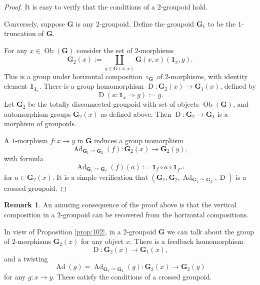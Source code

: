 \documentclass[a4paper,10pt]{amsart}
\theoremstyle{definition}
\newtheorem{rem}[equation]{Remark}
\numberwithin{equation}{section}
\newcommand{\opn}{\operatorname}
\newcommand{\bsym}[1]{\boldsymbol{#1}}
\newcommand{\twoto}{\Rightarrow}
\begin{document}
\begin{proof}
It is easy to verify that the conditions of a $2$-groupoid hold. 

Conversely, suppose $\bsym{G}$ is any $2$-groupoid. Define the groupoid
$\bsym{G}_1$ to be the $1$-truncation of $\bsym{G}$. 

For any $x \in \opn{Ob}(\bsym{G})$ consider the set of $2$-morphisms
\begin{equation} \label{eqn:105}
\bsym{G}_2(x) := \coprod_{g \in \bsym{G}(x, x)} 
\bsym{G}(x, x)(\bsym{1}_x, g) .
\end{equation}
This is a group under horizontal composition $\circ_{\bsym{G}}$
of $2$-morphisms, with identity element 
$\bsym{1}_{\bsym{1}_x}$. There is a group homomorphism 
$\opn{D} : \bsym{G}_2(x) \to \bsym{G}_1(x)$, defined by 
\begin{equation} \label{eqn:104}
\opn{D}(a : \bsym{1}_x \twoto g) := g  .
\end{equation}
Let $\bsym{G}_2$ be the totally disconnected groupoid with set of objects 
$\opn{Ob}(\bsym{G})$, and automorphism groups $\bsym{G}_2(x)$ as defined above.
Then $\opn{D} : \bsym{G}_2 \to \bsym{G}_1$
is a morphism of groupoids.

A $1$-morphism $f : x \to y$ in $\bsym{G}$ induces a group isomorphism 
\[ \opn{Ad}_{\bsym{G}_1 \curvearrowright \bsym{G}_{2}}(f) : 
\bsym{G}_2(x) \to \bsym{G}_2(y) , \]
with formula
\begin{equation} \label{eqn:106}
\opn{Ad}_{\bsym{G}_1 \curvearrowright \bsym{G}_{2}}(f)(a) := 
\bsym{1}_f \circ a \circ \bsym{1}_{f^{-1}} 
\end{equation}
for $a \in \bsym{G}_2(x)$.
It is a simple verification that
$(\bsym{G}_1, \bsym{G}_{2}, 
\opn{Ad}_{\bsym{G}_1 \curvearrowright \bsym{G}_{2}}, \opn{D})$
is a crossed groupoid.
\end{proof}

\begin{rem}
An amusing consequence of the proof above is that the vertical
composition in a $2$-groupoid can be recovered from the horizontal
compositions.
\end{rem}

In view of Proposition \ref{prop:102}, in a $2$-groupoid $\bsym{G}$ 
we can talk about the group of $2$-morphisms 
$\bsym{G}_2(x)$ for any object $x$. There is a feedback homomorphism 
\[ \opn{D} :  \bsym{G}_2(x) \to \bsym{G}_1(x) , \]
and a twisting 
\[ \opn{Ad}(g) =  
\opn{Ad}_{\bsym{G}_1 \curvearrowright \bsym{G}_{2}}(g) :
\bsym{G}_2(x) \to \bsym{G}_2(y)  \]
for any $g : x \to y$.
These satisfy the conditions of a crossed groupoid.
\end{document}
